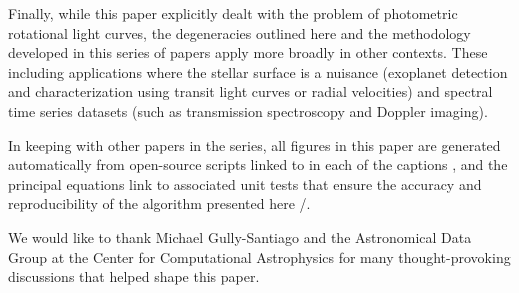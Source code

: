 \documentclass[modern]{aastex62}
\begin{document}
Finally, while this paper explicitly dealt with the problem of
photometric rotational light curves, the degeneracies outlined
here and the methodology developed in this series of papers
apply more broadly in other contexts.
These including applications where the stellar
surface is a nuisance (exoplanet detection and characterization using
transit light curves or radial velocities) and spectral time series
datasets (such as transmission spectroscopy and Doppler imaging).


\vspace{2em}

In keeping with other papers in the \starry series, all figures in this
paper are generated automatically from open-source scripts linked to in
each of the captions \codeicon, and the principal equations link to associated
unit tests that ensure the accuracy and reproducibility of the algorithm
presented here \testpassicon/\testfailicon.

%
%
%
%
%
%
%
%

\vspace{2em}

We would like to thank Michael Gully-Santiago and the
Astronomical Data Group at the Center for Computational Astrophysics for
many thought-provoking discussions that helped shape this paper.



\appendix
\end{document}
